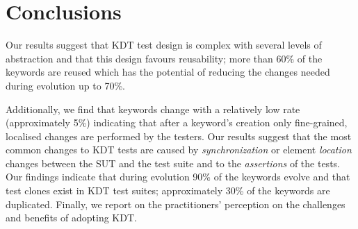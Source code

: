 \section{Conclusions}

Our results suggest that KDT test design is complex with several levels of abstraction and that this design favours reusability; more than 60\% of the keywords are reused which has the potential of reducing the changes needed during evolution up to 70\%.

Additionally, we find that keywords change with a relatively low rate (approximately 5\%) indicating that after a keyword's creation only fine-grained, localised changes are performed by the testers. Our results suggest that the most common changes to KDT tests are caused by \emph{synchronization} or element \emph{location} changes between the SUT and the test suite and to the \emph{assertions} of the tests. Our findings indicate that during evolution 90\% of the keywords evolve and that test clones exist in KDT test suites; approximately 30\% of the keywords are duplicated. Finally, we report on the practitioners' perception on the challenges and benefits of adopting KDT.